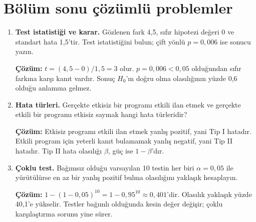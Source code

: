 \section{Bölüm sonu çözümlü problemler}

\begin{enumerate}
  \item \textbf{Test istatistiği ve karar.} Gözlenen fark 4,5, sıfır hipotezi değeri 0 ve standart hata 1,5'tir. Test istatistiğini bulun; çift yönlü $p=0{,}006$ ise sonucu yazın.

  \textbf{Çözüm:} $t=(4{,}5-0)/1{,}5=3$ olur. $p=0{,}006<0{,}05$ olduğundan sıfır farkına karşı kanıt vardır. Sonuç $H_0$'ın doğru olma olasılığının yüzde 0,6 olduğu anlamına gelmez.

  \item \textbf{Hata türleri.} Gerçekte etkisiz bir programı etkili ilan etmek ve gerçekte etkili bir programı etkisiz saymak hangi hata türleridir?

  \textbf{Çözüm:} Etkisiz programı etkili ilan etmek yanlış pozitif, yani Tip I hatadır. Etkili program için yeterli kanıt bulamamak yanlış negatif, yani Tip II hatadır. Tip II hata olasılığı $\beta$, güç ise $1-\beta$'dır.

  \item \textbf{Çoklu test.} Bağımsız olduğu varsayılan 10 testin her biri $\alpha=0{,}05$ ile yürütülürse en az bir yanlış pozitif bulma olasılığını yaklaşık hesaplayın.

  \textbf{Çözüm:} $1-(1-0{,}05)^{10}=1-0{,}95^{10}\approx0{,}401$'dir. Olasılık yaklaşık yüzde 40,1'e yükselir. Testler bağımlı olduğunda kesin değer değişir; çoklu karşılaştırma sorunu yine sürer.
\end{enumerate}